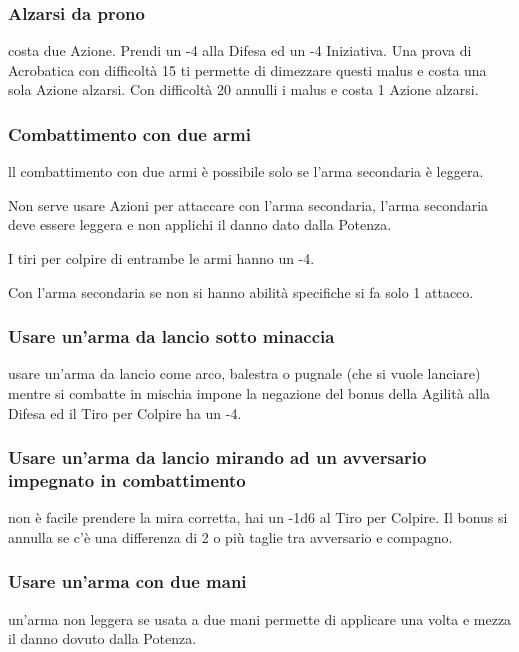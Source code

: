 \documentclass[a4paper,11pt,twoside,openany]{book}
\begin{document}
\subsubsection{Alzarsi da prono} costa due Azione. Prendi un -4 alla Difesa ed un -4 Iniziativa. Una prova di Acrobatica con difficoltà 15 ti permette di dimezzare questi malus e costa una sola Azione alzarsi. Con difficoltà 20 annulli i malus e costa 1 Azione alzarsi.

\subsubsection{Combattimento con due armi} ll combattimento con due armi è possibile solo se l'arma secondaria è leggera.

Non serve usare Azioni per attaccare con l'arma secondaria, l'arma secondaria deve essere leggera e non applichi il danno dato dalla Potenza.

I tiri per colpire di entrambe le armi hanno un -4.

Con l'arma secondaria se non si hanno abilità specifiche si fa solo 1 attacco.

\subsubsection{Usare un'arma da lancio sotto minaccia} usare un'arma da lancio come arco, balestra o pugnale (che si vuole lanciare) mentre si combatte in mischia impone la negazione del bonus della Agilità alla Difesa ed il Tiro per Colpire ha un -4.

\subsubsection{Usare un'arma da lancio mirando ad un avversario impegnato
	in combattimento} non è facile prendere la mira corretta, hai un -1d6 al Tiro per Colpire. Il bonus si annulla se c'è una differenza di 2 o più taglie tra avversario e compagno.

\subsubsection{Usare un'arma con due mani} un'arma non leggera se usata a due mani permette di applicare una volta e mezza il danno dovuto dalla Potenza.
\end{document}
